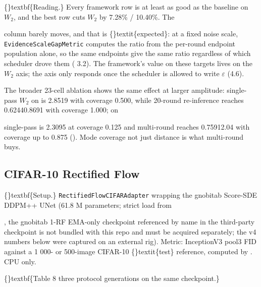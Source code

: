 \documentclass{article}
\begin{document}
\{\}textbf\{Reading.\} Every framework row is at least as good as the baseline on $W_2$, and the best row cuts $W_2$ by 7.28\% / 10.40\%. The

 column barely moves, and that is \{\}textit\{expected\}: at a fixed noise scale, \texttt{EvidenceScaleGapMetric} computes the ratio from the per-round endpoint population alone, so the same endpoints give the same ratio regardless of which scheduler drove them ( 3.2). The framework's value on these targets lives on the $W_2$ axis; the  axis only responds once the scheduler is allowed to write $\varepsilon$ (4.6).

The broader 23-cell ablation shows the same effect at larger amplitude: single-pass $W_2$ on  is 2.8519 with coverage 0.500, while 20-round re-inference reaches 0.62440.8691 with coverage 1.000; on

 single-pass is 2.3095 at coverage 0.125 and multi-round reaches 0.75912.04 with coverage up to 0.875 (). Mode coverage  not just distance  is what multi-round buys.

\subsection{CIFAR-10 Rectified Flow}
\{\}textbf\{Setup.\} \texttt{RectifiedFlowCIFARAdapter} wrapping the gnobitab Score-SDE DDPM++ UNet (61.8 M parameters; strict  load from

, the gnobitab 1-RF EMA-only checkpoint referenced by name in   the third-party checkpoint is not bundled with this repo and must be acquired separately; the v4 numbers below were captured on an external rig). Metric: InceptionV3 pool3 FID against a 1 000- or 500-image CIFAR-10 \{\}textit\{test\} reference, computed by . CPU only.

\{\}textbf\{Table 8  three protocol generations on the same checkpoint.\}
\end{document}
